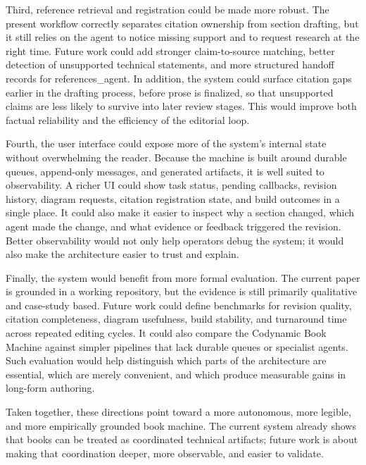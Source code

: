 \documentclass[11pt]{article}
\begin{document}
Third, reference retrieval and registration could be made more robust. The present workflow correctly separates citation ownership from section drafting, but it still relies on the agent to notice missing support and to request research at the right time. Future work could add stronger claim-to-source matching, better detection of unsupported technical statements, and more structured handoff records for references\_agent. In addition, the system could surface citation gaps earlier in the drafting process, before prose is finalized, so that unsupported claims are less likely to survive into later review stages. This would improve both factual reliability and the efficiency of the editorial loop.

Fourth, the user interface could expose more of the system's internal state without overwhelming the reader. Because the machine is built around durable queues, append-only messages, and generated artifacts, it is well suited to observability. A richer UI could show task status, pending callbacks, revision history, diagram requests, citation registration state, and build outcomes in a single place. It could also make it easier to inspect why a section changed, which agent made the change, and what evidence or feedback triggered the revision. Better observability would not only help operators debug the system; it would also make the architecture easier to trust and explain.

Finally, the system would benefit from more formal evaluation. The current paper is grounded in a working repository, but the evidence is still primarily qualitative and case-study based. Future work could define benchmarks for revision quality, citation completeness, diagram usefulness, build stability, and turnaround time across repeated editing cycles. It could also compare the Codynamic Book Machine against simpler pipelines that lack durable queues or specialist agents. Such evaluation would help distinguish which parts of the architecture are essential, which are merely convenient, and which produce measurable gains in long-form authoring.

Taken together, these directions point toward a more autonomous, more legible, and more empirically grounded book machine. The current system already shows that books can be treated as coordinated technical artifacts; future work is about making that coordination deeper, more observable, and easier to validate.


\end{document}

